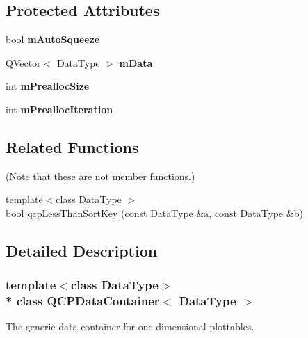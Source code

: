 \subsection*{Protected Attributes}
\begin{DoxyCompactItemize}
\item 
bool {\bfseries m\+Auto\+Squeeze}\hypertarget{classQCPDataContainer_aae64c517d64511ad7a81ff8ee7b29147}{}\label{classQCPDataContainer_aae64c517d64511ad7a81ff8ee7b29147}

\item 
Q\+Vector$<$ Data\+Type $>$ {\bfseries m\+Data}\hypertarget{classQCPDataContainer_a74906b4da829849c4062b5337c72585d}{}\label{classQCPDataContainer_a74906b4da829849c4062b5337c72585d}

\item 
int {\bfseries m\+Prealloc\+Size}\hypertarget{classQCPDataContainer_a3554d3ad00e69f7ce057efa00ea6f4b2}{}\label{classQCPDataContainer_a3554d3ad00e69f7ce057efa00ea6f4b2}

\item 
int {\bfseries m\+Prealloc\+Iteration}\hypertarget{classQCPDataContainer_ab2115bf023c29691f441eaf1889de84a}{}\label{classQCPDataContainer_ab2115bf023c29691f441eaf1889de84a}

\end{DoxyCompactItemize}
\subsection*{Related Functions}
(Note that these are not member functions.) \begin{DoxyCompactItemize}
\item 
{\footnotesize template$<$class Data\+Type $>$ }\\bool \hyperlink{classQCPDataContainer_a74c5e06728cb6fa778a25d9ec0c4bd36}{qcp\+Less\+Than\+Sort\+Key} (const Data\+Type \&a, const Data\+Type \&b)
\end{DoxyCompactItemize}


\subsection{Detailed Description}
\subsubsection*{template$<$class Data\+Type$>$\\*
class Q\+C\+P\+Data\+Container$<$ Data\+Type $>$}

The generic data container for one-\/dimensional plottables. 

